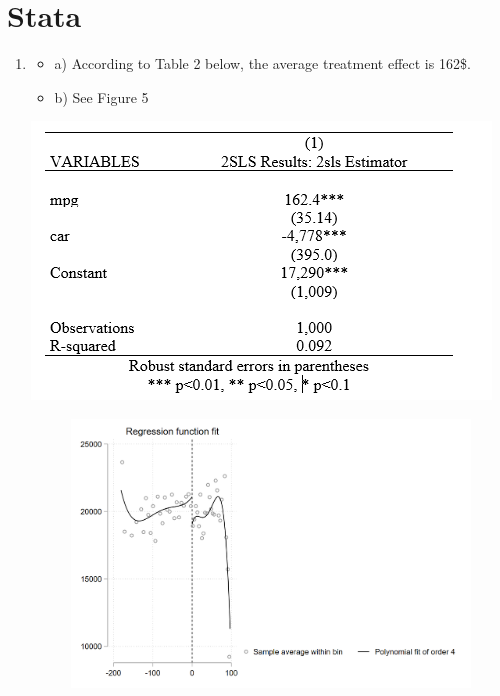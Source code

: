 \documentclass{article}
\begin{document}
\section{Stata}

\begin{enumerate}

\item 
\begin{itemize}
    \item a) According to Table 2 below, the average treatment effect is 162\$. 
    \item b) See Figure 5
\end{itemize}

\begin{table}[ht]
\centering
\includegraphics[scale=0.9]{Table3.png}
\caption{}
\label{fig:}
\end{table}

\begin{figure}[ht]
\centering
\includegraphics[scale=0.4]{Table5.png}
\caption{}
\label{fig:}
\end{figure}


\end{enumerate}
\end{document}
